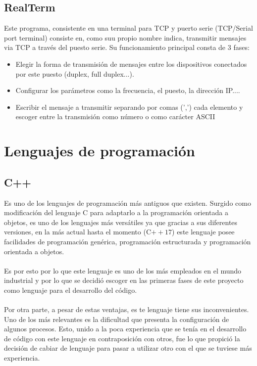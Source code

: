 \subsection{RealTerm}

Este programa, consistente en una terminal para TCP y puerto serie (TCP/Serial port terminal) consiste en, como suu propio nombre indica, transmitir mensajes via TCP a través del puesto serie. Su funcionamiento principal consta de 3 fases:
\begin{itemize}
	\item Elegir la forma de transmisión de mensajes entre los dispositivos conectados por este puesto (duplex, full duplex...).
	\item Configurar los parámetros como la frecuencia, el puesto, la dirección IP....
	\item Escribir el mensaje a transmitir separando por comas (',') cada elemento y escoger entre la transmisión como número o como carácter ASCII
\end{itemize}

\section{Lenguajes de programación}

\subsection{C++}
Es uno de los lenguajes de programación más antiguos que existen. Surgido como modificación del lenguaje C para adaptarlo a la programación orientada a objetos, es uno de los lenguajes más versátiles ya que gracias a sus diferentes versiones, en la más actual hasta el momento (C$++17$) este lenguaje posee facilidades de programación genérica,  programación estructurada y programación orientada a objetos.\cite{wikiCpp}\\
\\
Es por esto por lo que este lenguaje es uno de los más empleados en el mundo industrial y por lo que se decidió escoger en las primeras fases de este proyecto como lenguaje para el desarrollo del código.\\
\\
Por otra parte, a pesar de estas ventajas, es te lenguaje tiene sus inconvenientes. Uno de los más relevantes es la dificultad que presenta la configuración de algunos procesos. Esto, unido a la poca experiencia que se tenía en el desarrollo de código con este lenguaje en contraposición con otros, fue lo que propició la decisión de cabiar de lenguaje para pasar a utilizar otro con el que se tuviese más experiencia.


